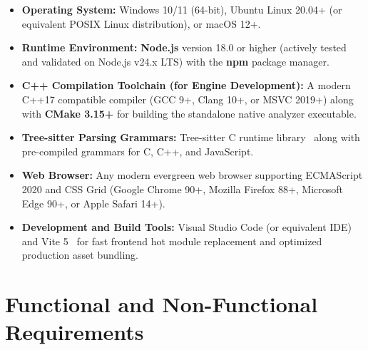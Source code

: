 \begin{itemize}
    \item \textbf{Operating System:} Windows 10/11 (64-bit), Ubuntu Linux 20.04+ (or equivalent POSIX Linux distribution), or macOS 12+.
    \item \textbf{Runtime Environment:} \textbf{Node.js} version 18.0 or higher (actively tested and validated on Node.js v24.x LTS) with the \textbf{npm} package manager.
    \item \textbf{C++ Compilation Toolchain (for Engine Development):} A modern C++17 compatible compiler (GCC 9+, Clang 10+, or MSVC 2019+) along with \textbf{CMake 3.15+} for building the standalone native analyzer executable.
    \item \textbf{Tree-sitter Parsing Grammars:} Tree-sitter C runtime library~\cite{treesitter} along with pre-compiled grammars for C, C++, and JavaScript.
    \item \textbf{Web Browser:} Any modern evergreen web browser supporting ECMAScript 2020 and CSS Grid (Google Chrome 90+, Mozilla Firefox 88+, Microsoft Edge 90+, or Apple Safari 14+).
    \item \textbf{Development and Build Tools:} Visual Studio Code (or equivalent IDE) and Vite 5~\cite{vite} for fast frontend hot module replacement and optimized production asset bundling.
\end{itemize}

\section{Functional and Non-Functional Requirements}

